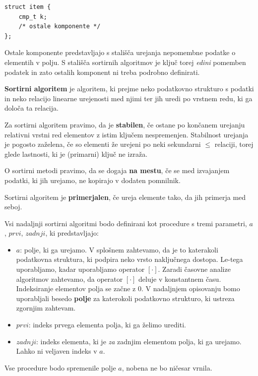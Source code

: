 \documentclass[a4paper,oneside,12pt]{article}
\begin{document}
\begin{lstlisting}
struct item {
    cmp_t k;
    /* ostale komponente */
};
\end{lstlisting}

Ostale komponente predstavljajo s stališča urejanja nepomembne podatke o elementih v
polju.
S stališča sortirnih algoritmov je ključ torej \emph{edini} pomemben podatek in zato
ostalih komponent ni treba podrobno definirati.

\begin{definicija}
  \textbf{Sortirni algoritem} je algoritem, ki prejme neko podatkovno strukturo s podatki
  in neko relacijo linearne urejenosti med njimi ter jih uredi po vrstnem redu, ki ga določa ta
  relacija.
\end{definicija}

\begin{definicija}
  Za sortirni algoritem pravimo, da je \textbf{stabilen}, če ostane po končanem urejanju
  relativni vrstni red elementov z istim ključem nespremenjen.
  Stabilnost urejanja je pogosto zaželena, če so elementi že urejeni po neki
  sekundarni $\leq$ relaciji, torej glede lastnosti, ki je (primarni) ključ ne izraža.
\end{definicija}

\begin{definicija}
  O sortirni metodi pravimo, da se dogaja \textbf{na mestu}, če se med izvajanjem podatki, ki
  jih urejamo, ne kopirajo v dodaten pomnilnik.
\end{definicija}

\begin{definicija}
  Sortirni algoritem je \textbf{primerjalen}, če ureja elemente tako, da jih primerja med seboj.
\end{definicija}


Vsi nadaljnji sortirni algoritmi bodo definirani kot procedure s tremi parametri, $a$, $prvi$,
$zadnji$, ki predstavljajo:
\begin{itemize}
  \item $a$: polje, ki ga urejamo. V splošnem zahtevamo, da je to katerakoli podatkovna
    struktura, ki podpira neko vrsto naključnega dostopa. Le-tega uporabljamo, kadar 
    uporabljamo operator $[\cdot]$. Zaradi časovne analize algoritmov zahtevamo, da operator 
    $[\cdot]$ deluje v konstantnem času. Indeksiranje elementov polja se začne z 0.
    V nadaljnjem opisovanju bomo uporabljali besedo
    \textbf{polje} za katerokoli podatkovno strukturo, ki ustreza zgornjim zahtevam.
  \item $prvi$: indeks prvega elementa polja, ki ga želimo urediti.
  \item $zadnji$: indeks elementa, ki je \emph{za} zadnjim elementom polja, ki ga urejamo. Lahko ni
    veljaven indeks v $a$.
\end{itemize}
Vse procedure bodo spremenile polje $a$, nobena ne bo ničesar vrnila.
\end{document}
